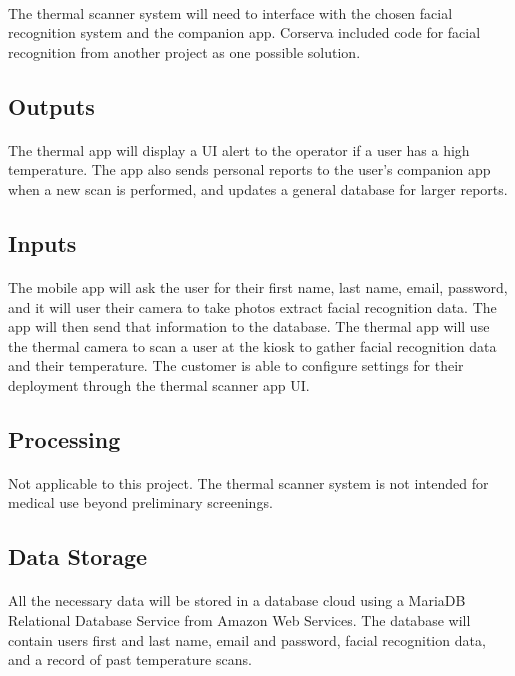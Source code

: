 \documentclass[12pt, letterpaper]{article}
\begin{document}
    \paragraph{}
    The thermal scanner system will need to interface with the chosen facial recognition system and the companion app. 
    Corserva included code for facial recognition from another project as one possible solution.
    \subsection{Outputs}
    \paragraph{}
    The thermal app will display a UI alert to the operator if a user has a high temperature.  The app also sends personal reports
    to the user's companion app when a new scan is performed, and updates a general database for larger reports.
    \subsection{Inputs}
    \paragraph{}
    The mobile app will ask the user for their first name, last name, email, password, and 
    it will user their camera to take photos extract facial recognition data. 
    The app will then send that information to the database. The thermal app will use 
    the thermal camera to scan a user at the kiosk to gather facial recognition data 
    and their temperature.  The customer is able to configure settings for their deployment through the thermal scanner app UI.
    \subsection{Processing}
    \paragraph{}
    Not applicable to this project. The thermal scanner system is not intended for medical use beyond preliminary
    screenings. 
    \subsection{Data Storage}
    \paragraph{}
    All the necessary data will be stored in a database cloud using a MariaDB 
    Relational Database Service from Amazon Web Services. The database will contain 
    users first and last name, email and password, facial recognition data, and a 
    record of past temperature scans.
    \newpage
\end{document}
